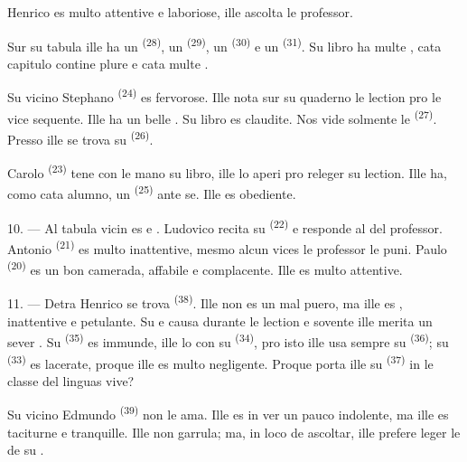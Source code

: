 Henrico es multo attentive e laboriose, ille ascolta le professor.

Sur su tabula ille ha un  \textsuperscript{(28)}, un
 \textsuperscript{(29)}, un 
\textsuperscript{(30)} e un  \textsuperscript{(31)}. Su
libro ha multe , cata capitulo contine plure
 e cata  multe .

Su vicino Stephano \textsuperscript{(24)} es fervorose. Ille nota sur su
quaderno le lection pro le vice sequente. Ille ha un belle
. Su libro es claudite. Nos vide solmente le 
\textsuperscript{(27)}. Presso ille se trova su 
\textsuperscript{(26)}.

Carolo \textsuperscript{(23)} tene con le mano su libro, ille lo aperi pro
releger su lection. Ille ha, como cata alumno, un 
\textsuperscript{(25)} ante se. Ille es obediente.

10. --- Al tabula vicin es  e . Ludovico
recita su  \textsuperscript{(22)} e responde al
 del professor. Antonio \textsuperscript{(21)} es multo
inattentive, mesmo alcun vices le professor le puni. Paulo
\textsuperscript{(20)} es un bon camerada, affabile e complacente. Ille es
multo attentive.

\VUsaut{4.2mm}
\VUsaut{3.2mm}

11. --- Detra Henrico se trova  \textsuperscript{(38)}. Ille non
es un mal puero, ma ille es , inattentive e petulante. Su
 e  causa  durante
le lection e sovente ille merita un sever . Su
 \textsuperscript{(35)} es immunde, ille lo
 con su  \textsuperscript{(34)}, pro
isto ille usa sempre su  \textsuperscript{(36)}; su
 \textsuperscript{(33)} es lacerate, proque ille es multo
negligente. Proque porta ille su  \textsuperscript{(37)} in
le classe del linguas vive?

Su vicino Edmundo \textsuperscript{(39)} non le ama. Ille es in ver un pauco
indolente, ma ille es taciturne e tranquille. Ille non garrula; ma, in loco de
ascoltar, ille prefere leger le  de su .

